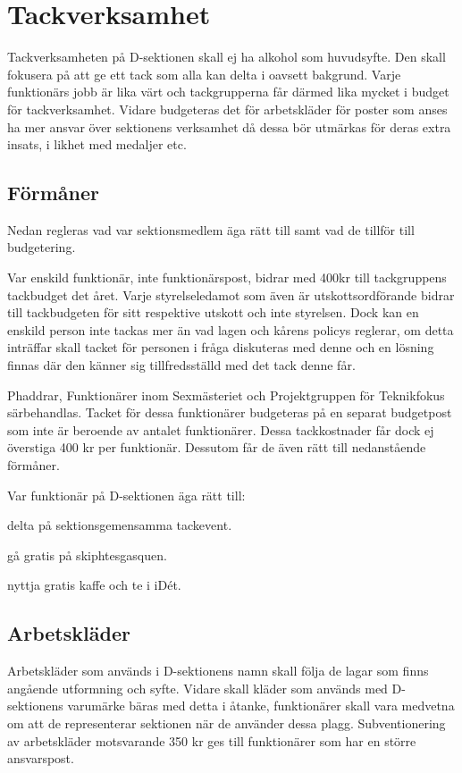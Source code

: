 \documentclass{dsekprotokoll}
\begin{document}
\section{Tackverksamhet}
Tackverksamheten på D-sektionen skall ej ha alkohol som huvudsyfte. Den skall fokusera på att ge ett tack som alla kan delta i oavsett bakgrund. Varje funktionärs jobb är lika värt och tackgrupperna får därmed lika mycket i budget för tackverksamhet. Vidare budgeteras det för arbetskläder för poster som anses ha mer ansvar över sektionens verksamhet då dessa bör utmärkas för deras extra insats, i likhet med medaljer etc.
\subsection{Förmåner}
\par Nedan regleras vad var sektionsmedlem äga rätt till samt vad de tillför till budgetering.
\par Var enskild funktionär, inte funktionärspost, bidrar med 400kr till tackgruppens tackbudget det året. Varje styrelseledamot som även är utskottsordförande bidrar till tackbudgeten för sitt respektive utskott och inte styrelsen. Dock kan en enskild person inte tackas mer än vad lagen och kårens policys reglerar, om detta inträffar skall tacket för personen i fråga diskuteras med denne och en lösning finnas där den känner sig tillfredsställd med det tack denne får.
\par Phaddrar, Funktionärer inom Sexmästeriet och Projektgruppen för Teknikfokus särbehandlas. Tacket för dessa funktionärer budgeteras på en separat budgetpost som inte är beroende av antalet funktionärer. Dessa tackkostnader får dock ej överstiga 400 kr per funktionär. Dessutom får de även rätt till nedanstående förmåner.

Var funktionär på D-sektionen äga rätt till:
\begin{attlista}
  \item delta på sektionsgemensamma tackevent.
  \item gå gratis på skiphtesgasquen.
  \item nyttja gratis kaffe och te i iDét.
\end{attlista}

\subsection{Arbetskläder}
\par Arbetskläder som används i D-sektionens namn skall följa de lagar som finns angående utformning och syfte. Vidare skall kläder som används med D-sektionens varumärke bäras med detta i åtanke, funktionärer skall vara medvetna om att de representerar sektionen när de använder dessa plagg.
Subventionering av arbetskläder motsvarande 350 kr ges till funktionärer som har en större ansvarspost.
\end{document}
